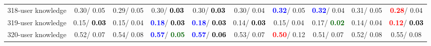 \begin{table}[h]
\begin{center}
{\begin{tabular}{lc|c|c|c|c|c|c|c|c}
318-user knowledge &   0.30/  0.05 &   0.29/  0.05 &   0.30/\textcolor{black}{\textbf{  0.03}} &   0.30/\textcolor{black}{\textbf{  0.03}} &   0.30/  0.04 & \textcolor{blue}{\textbf{  0.32}}/  0.05 & \textcolor{blue}{\textbf{  0.32}}/  0.04 &   0.31/  0.05 & \textcolor{red}{\textbf{  0.28}}/  0.04 \\
319-user knowledge &   0.15/\textcolor{black}{\textbf{  0.03}} &   0.15/  0.04 & \textcolor{blue}{\textbf{  0.18}}/\textcolor{black}{\textbf{  0.03}} & \textcolor{blue}{\textbf{  0.18}}/\textcolor{black}{\textbf{  0.03}} &   0.14/\textcolor{black}{\textbf{  0.03}} &   0.15/  0.04 &   0.17/\textcolor{darkgreen}{\textbf{  0.02}} &   0.14/  0.04 & \textcolor{red}{\textbf{  0.12}}/\textcolor{black}{\textbf{  0.03}} \\
320-user knowledge &   0.52/  0.07 &   0.54/  0.08 & \textcolor{blue}{\textbf{  0.57}}/\textcolor{darkgreen}{\textbf{  0.05}} & \textcolor{blue}{\textbf{  0.57}}/\textcolor{black}{\textbf{  0.06}} &   0.53/  0.07 & \textcolor{red}{\textbf{  0.50}}/  0.12 &   0.51/  0.07 &   0.52/  0.08 &   0.55/  0.08 \\\end{tabular}}\label{stratsALCKappa9AllRedux50a}
\end{center}
\end{table}
